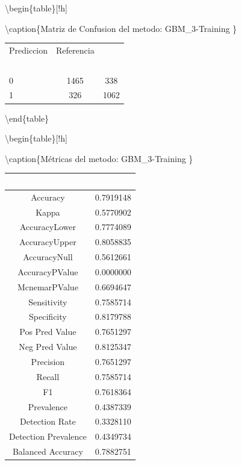 \documentclass[]{article}
\begin{document}
\textbackslash{}begin\{table\}{[}!h{]}

\textbackslash{}caption\{\label{tab:MatrizConf_GBM_3-Training}Matriz de
Confusion del metodo: GBM\_3-Training \} \centering

\begin{tabular}[t]{lcc}
\toprule
\multicolumn{1}{c}{Prediccion} & \multicolumn{1}{c}{Referencia} & \multicolumn{1}{c}{ } \\
\cmidrule(l{3pt}r{3pt}){1-1} \cmidrule(l{3pt}r{3pt}){2-2}
\rowcolor{black}  \multicolumn{1}{c}{\textcolor{white}{\textbf{ }}} & \multicolumn{1}{c}{\textcolor{white}{\textbf{0}}} & \multicolumn{1}{c}{\textcolor{white}{\textbf{1}}}\\
\midrule
\rowcolor{gray!6}  0 & 1465 & 338\\
1 & 326 & 1062\\
\bottomrule
\end{tabular}

\textbackslash{}end\{table\}

\textbackslash{}begin\{table\}{[}!h{]}

\textbackslash{}caption\{\label{tab:metricas_GBM_3-Training}Métricas del
metodo: GBM\_3-Training \} \centering

\begin{tabular}[t]{cc}
\toprule
\rowcolor{black}  \multicolumn{1}{c}{\textcolor{white}{\textbf{metricas}}} & \multicolumn{1}{c}{\textcolor{white}{\textbf{valor}}}\\
\midrule
\rowcolor{gray!6}  Accuracy & 0.7919148\\
Kappa & 0.5770902\\
\rowcolor{gray!6}  AccuracyLower & 0.7774089\\
AccuracyUpper & 0.8058835\\
\rowcolor{gray!6}  AccuracyNull & 0.5612661\\
\addlinespace
AccuracyPValue & 0.0000000\\
\rowcolor{gray!6}  McnemarPValue & 0.6694647\\
Sensitivity & 0.7585714\\
\rowcolor{gray!6}  Specificity & 0.8179788\\
Pos Pred Value & 0.7651297\\
\addlinespace
\rowcolor{gray!6}  Neg Pred Value & 0.8125347\\
Precision & 0.7651297\\
\rowcolor{gray!6}  Recall & 0.7585714\\
F1 & 0.7618364\\
\rowcolor{gray!6}  Prevalence & 0.4387339\\
\addlinespace
Detection Rate & 0.3328110\\
\rowcolor{gray!6}  Detection Prevalence & 0.4349734\\
Balanced Accuracy & 0.7882751\\
\bottomrule
\end{tabular}
\end{document}
